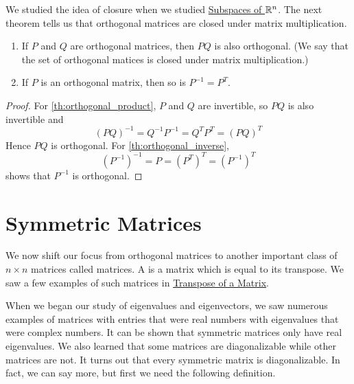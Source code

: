 \documentclass{ximera}
\begin{document}
We studied the idea of closure when we studied \href{\xmbaseurl/VSP-0020/main}{Subspaces of $\mathbb{R}^n$}.  The next theorem tells us that orthogonal matrices are closed under matrix multiplication.

\begin{theorem}\label{th:orthogonal_product_inverse}
\begin{enumerate}
    \item\label{th:orthogonal_product}
    If $P$ and $Q$ are orthogonal matrices, then $PQ$ is also orthogonal. (We say that the set of orthogonal matices is closed under matrix multiplication.)
    \item\label{th:orthogonal_inverse}
    If $P$ is an orthogonal matrix, then so is $P^{-1} = P^{T}$.
\end{enumerate}

\begin{proof}
For \ref{th:orthogonal_product}, $P$ and $Q$ are invertible, so $PQ$ is also invertible and
\begin{equation*}
(PQ)^{-1} = Q^{-1}P^{-1} = Q^{T}P^{T} = (PQ)^{T}
\end{equation*}
Hence $PQ$ is orthogonal. For \ref{th:orthogonal_inverse},
\begin{equation*}
(P^{-1})^{-1} = P = (P^{T})^{T} = (P^{-1})^{T}
\end{equation*}
shows that $P^{-1}$ is orthogonal.
\end{proof}
\end{theorem}

\section*{Symmetric Matrices}

We now shift our focus from orthogonal matrices to another important class of $n \times n$ matrices called  matrices.  A  is a matrix which is equal to its transpose.  We saw a few examples of such matrices in \href{\xmbaseurl/MAT-0025/main}{Transpose of a Matrix}.

When we began our study of eigenvalues and eigenvectors, we saw numerous examples of matrices with entries that were real numbers with eigenvalues that were complex numbers.  It can be shown that symmetric matrices only have real eigenvalues.  We also learned that some matrices are diagonalizable while other matrices are not.  It turns out that every symmetric matrix is diagonalizable.  In fact, we can say more, but first we need the following definition.
\end{document}
